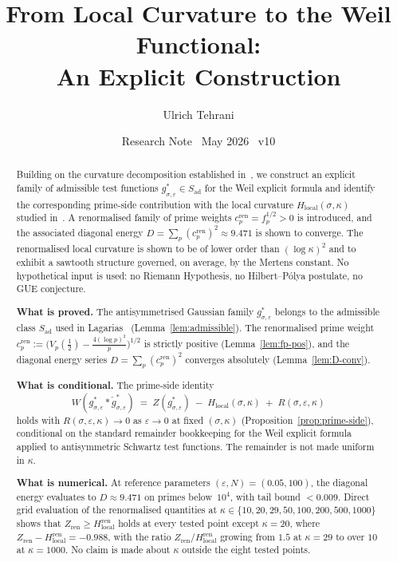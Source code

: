 \documentclass[11pt]{article}
\title{\vspace{-1.5em}\bfseries
From Local Curvature to the Weil Functional:\\[0.4em]
\large An Explicit Construction}
\author{Ulrich Tehrani}
\date{Research Note \textperiodcentered\ May 2026
      \textperiodcentered\ v10}
\newcommand{\Hlocal}{H_{\mathrm{local}}}
\newcommand{\Hren}{H_{\mathrm{local}}^{\mathrm{ren}}}
\newcommand{\Sad}{S_{\mathrm{ad}}}
\newcommand{\cren}{c_p^{\mathrm{ren}}}
\newcommand{\Zren}{Z_{\mathrm{ren}}}
\begin{document}
\maketitle

\begin{abstract}
Building on the curvature decomposition established
in~\cite{Paper1}, we construct an explicit family of admissible
test functions $g^*_{\sigma,\varepsilon}\in\Sad$ for the Weil
explicit formula and identify the corresponding prime-side
contribution with the local curvature
$\Hlocal(\sigma,\kappa)$ studied in~\cite{Paper1}.
A renormalised family of prime weights
$\cren=f_p^{1/2}>0$ is introduced, and the associated diagonal
energy $D=\sum_p (\cren)^2\approx 9.471$ is shown to converge.
The renormalised local curvature is shown to be of lower order
than $(\log\kappa)^2$ and to exhibit a sawtooth structure governed,
on average, by the Mertens constant.
No hypothetical input is used: no Riemann Hypothesis, no
Hilbert--P\'olya postulate, no GUE conjecture.

\textbf{What is proved.}
The antisymmetrised Gaussian family $g^*_{\sigma,\varepsilon}$
belongs to the admissible class $\Sad$ used in
Lagarias~\cite{Lagarias} (Lemma~\ref{lem:admissible}).
The renormalised prime weight
$\cren := \bigl(V_p(\tfrac12)-\tfrac{4(\log p)^2}{p}\bigr)^{1/2}$
is strictly positive (Lemma~\ref{lem:fp-pos}), and the diagonal
energy series $D=\sum_p (\cren)^2$ converges absolutely
(Lemma~\ref{lem:D-conv}).

\textbf{What is conditional.}
The prime-side identity
\[
W(g^*_{\sigma,\varepsilon}*\check g^*_{\sigma,\varepsilon})
\;=\; Z(g^*_{\sigma,\varepsilon})\;-\;\Hlocal(\sigma,\kappa)
\;+\; R(\sigma,\varepsilon,\kappa)
\]
holds with $R(\sigma,\varepsilon,\kappa)\to 0$ as
$\varepsilon\to 0$ at fixed $(\sigma,\kappa)$
(Proposition~\ref{prop:prime-side}), conditional on the standard
remainder bookkeeping for the Weil explicit formula applied to
antisymmetric Schwartz test functions.
The remainder is not made uniform in $\kappa$.

\textbf{What is numerical.}
At reference parameters $(\varepsilon,N)=(0.05,100)$, the
diagonal energy evaluates to $D\approx 9.471$ on primes
below~$10^4$, with tail bound $<0.009$.
Direct grid evaluation of the renormalised quantities at
$\kappa\in\{10,20,29,50,100,200,500,1000\}$ shows that
$\Zren\ge\Hren$ holds at every tested point except $\kappa=20$,
where $\Zren-\Hren=-0.988$, with the ratio $\Zren/\Hren$ growing
from $1.5$ at $\kappa=29$ to over $10$ at $\kappa=1000$.
No claim is made about $\kappa$ outside the eight tested points.


\end{abstract}
\end{document}
